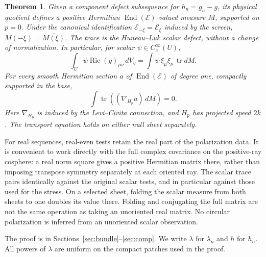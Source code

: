 \documentclass[11pt]{article}
\newtheorem{theorem}{Theorem}
\begin{document}
\begin{theorem}
Given a component defect subsequence for \(h_n=g_n-g\), its physical quotient defines a positive Hermitian \(\operatorname{End}(\mathcal E)\)-valued measure \(M\), supported on \(p=0\). Under the canonical identification \(\mathcal E_{-\xi}=\mathcal E_\xi\) induced by the screen, \(M(-\xi)=\overline{M(\xi)}\). The trace is the Huneau--Luk scalar defect, without a change of normalization. In particular, for scalar \(\psi\in C_c^\infty(U)\),
\[
 \int_U \psi\operatorname{Ric}(g)_{\mu\nu}\,dV_g
 =\int\psi\,\xi_\mu\xi_\nu\,\operatorname{tr}dM.
\]
For every smooth Hermitian section \(a\) of \(\operatorname{End}(\mathcal E)\) of degree one, compactly supported in the base,
\[
 \int \operatorname{tr}\left((\nabla_{H_p}a)\,dM\right)=0.
\]
Here \(\nabla_{H_p}\) is induced by the Levi--Civita connection, and \(H_p\) has projected speed \(2k\). The transport equation holds on either null sheet separately.
\end{theorem}

For real sequences, real-even tests retain the real part of the polarization data. It is convenient to work directly with the full complex covariance on the positive-ray cosphere: a real norm square gives a positive Hermitian matrix there, rather than imposing transpose symmetry separately at each oriented ray. The scalar trace pairs identically against the original scalar tests, and in particular against those used for the stress. On a selected sheet, folding the scalar measure from both sheets to one doubles its value there. Folding and conjugating the full matrix are not the same operation as taking an unoriented real matrix. No circular polarization is inferred from an unoriented scalar observation.

The proof is in Sections~\ref{sec:bundle}--\ref{sec:comp}. We write \(\lambda\) for \(\lambda_n\) and \(h\) for \(h_n\). All powers of \(\lambda\) are uniform on the compact patches used in the proof.
\end{document}
